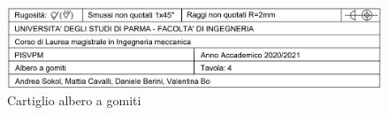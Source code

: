 \begin{figure}[h]
    \centering
    \includegraphics[scale=0.5]{Immagini/CartiglioAlbero.png}
    \caption{Cartiglio albero a gomiti}
    \label{fig:CartiglioAlbero}
\end{figure}
















